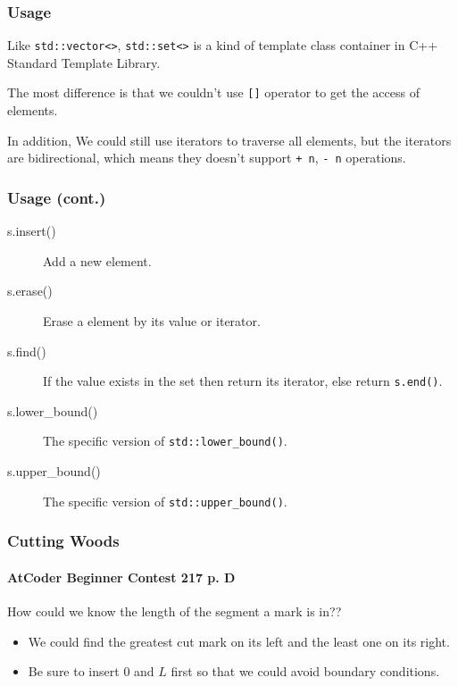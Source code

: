 \documentclass{beamer}
\begin{document}
\frame
{
	\frametitle{Usage}
	
	Like \texttt{std::vector<>}, \texttt{std::set<>} is a kind of template class container in C++ Standard Template Library.
	
	The most difference is that we couldn't use \texttt{[]} operator to get the access of elements.
	
	In addition, We could still use iterators to traverse all elements, but the iterators are bidirectional, which means they doesn't support \texttt{+ n}, \texttt{- n} operations.
}

\frame
{
	\frametitle{Usage (cont.)}
	
	\begin{description}
		\item[\ttfamily s.insert()] Add a new element.
		\item[\ttfamily s.erase()] Erase a element by its value or iterator.
		\item[\ttfamily s.find()] If the value exists in the set then return its iterator, else return \texttt{s.end()}.
		\item[\ttfamily s.lower\_bound()] The specific version of \texttt{std::lower\_bound()}.
		\item[\ttfamily s.upper\_bound()] The specific version of \texttt{std::upper\_bound()}.
	\end{description}
}

\frame
{
	\frametitle{Cutting Woods}
	\framesubtitle{AtCoder Beginner Contest 217 p. D}
	
	How could we know the length of the segment a mark is in??\pause
	
	\begin{itemize}
		\item We could find the greatest cut mark on its left and the least one on its right.\pause
		\item Be sure to insert $0$ and $L$ first so that we could avoid boundary  conditions.
	\end{itemize}
}
\end{document}
